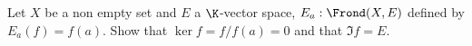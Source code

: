 Let $X$ be a non empty set and $E$ a $\K$-vector space, $E_a : \Frond(X, E)$ defined by $E_a(f) = f(a)$.
Show that $\ker f = {f / f(a) = 0}$ and that $\Im f = E$.
